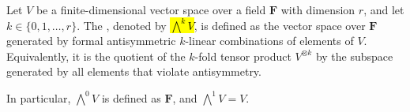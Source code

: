 \begin{definition} \label{definition:exterior_power_of_a_vector_space_over_a_field}
Let $V$ be a finite-dimensional vector space over a field $\mathbf{F}$ with dimension $r$, and let $k \in \{0,1,\ldots,r\}$. The , denoted by \hl{$\bigwedge^k V$}, is defined as the vector space over $\mathbf{F}$ generated by formal antisymmetric $k$-linear combinations of elements of $V$. Equivalently, it is the quotient of the $k$-fold tensor product $V^{\otimes k}$ by the subspace generated by all elements that violate antisymmetry.

In particular, $\bigwedge^0 V$ is defined as $\mathbf{F}$, and $\bigwedge^1 V = V$.
\end{definition}

